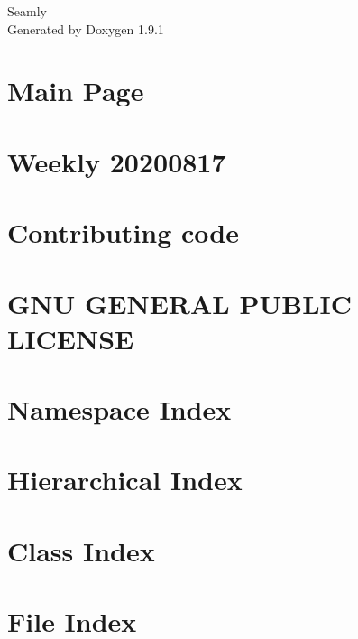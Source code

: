 \let\mypdfximage\pdfximage\def\pdfximage{\immediate\mypdfximage}\documentclass[twoside]{book}
\newcommand{\+}{\discretionary{\mbox{\scriptsize$\hookleftarrow$}}{}{}}
\newcommand{\clearemptydoublepage}{%
  \newpage{\pagestyle{empty}\cleardoublepage}%
}
\begin{document}
\raggedbottom

\hypersetup{pageanchor=false,
             bookmarksnumbered=true,
             pdfencoding=unicode
            }
\begin{titlepage}
\vspace*{7cm}
\begin{center}%
{\Large Seamly }\\
\vspace*{1cm}
{\large Generated by Doxygen 1.9.1}\\
\end{center}
\end{titlepage}
\clearemptydoublepage
{}
\tableofcontents
\clearemptydoublepage
{}
\hypersetup{pageanchor=true}

\chapter{Main Page}
\label{index}\hypertarget{index}{}
\chapter{Weekly 20200817}
\label{md_CHANGELOG}

\chapter{Contributing code}
\label{md_CONTRIBUTING}

\chapter{GNU GENERAL PUBLIC LICENSE}
\label{md_LICENSE}

\chapter{Namespace Index}

\chapter{Hierarchical Index}

\chapter{Class Index}

\chapter{File Index}

\end{document}
